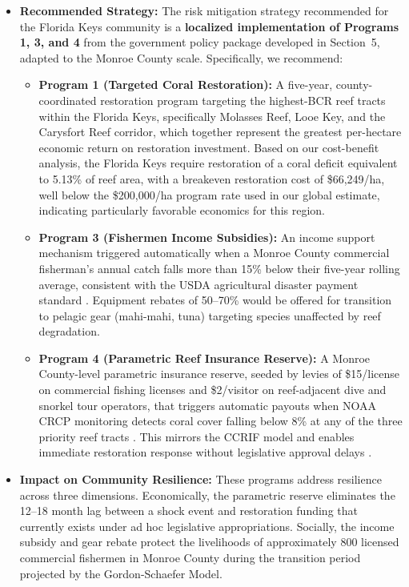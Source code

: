 \documentclass[10pt,letterpaper]{article}
\newcounter{metric}
\begin{document}
\begin{itemize}

    \item \textbf{Recommended Strategy:} The risk mitigation strategy recommended for the Florida Keys community is a \textbf{localized implementation of Programs 1, 3, and 4} from the government policy package developed in Section~5, adapted to the Monroe County scale. Specifically, we recommend:
    \begin{itemize}
        \item \textbf{Program 1 (Targeted Coral Restoration):} A five-year, county-coordinated restoration program targeting the highest-BCR reef tracts within the Florida Keys, specifically Molasses Reef, Looe Key, and the Carysfort Reef corridor, which together represent the greatest per-hectare economic return on restoration investment. Based on our cost-benefit analysis, the Florida Keys require restoration of a coral deficit equivalent to 5.13\% of reef area, with a breakeven restoration cost of \$66,249/ha, well below the \$200,000/ha program rate used in our global estimate, indicating particularly favorable economics for this region.
        \item \textbf{Program 3 (Fishermen Income Subsidies):} An income support mechanism triggered automatically when a Monroe County commercial fisherman's annual catch falls more than 15\% below their five-year rolling average, consistent with the USDA agricultural disaster payment standard \cite{usda_disaster}. Equipment rebates of 50--70\% would be offered for transition to pelagic gear (mahi-mahi, tuna) targeting species unaffected by reef degradation.
        \item \textbf{Program 4 (Parametric Reef Insurance Reserve):} A Monroe County-level parametric insurance reserve, seeded by levies of \$15/license on commercial fishing licenses and \$2/visitor on reef-adjacent dive and snorkel tour operators, that triggers automatic payouts when NOAA CRCP monitoring detects coral cover falling below 8\% at any of the three priority reef tracts \cite{noaa_crcp}. This mirrors the CCRIF model and enables immediate restoration response without legislative approval delays \cite{ccrif_reef_insurance}.
    \end{itemize}

    \item \textbf{Impact on Community Resilience:} These programs address resilience across three dimensions. Economically, the parametric reserve eliminates the 12--18 month lag between a shock event and restoration funding that currently exists under ad hoc legislative appropriations. Socially, the income subsidy and gear rebate protect the livelihoods of approximately 800 licensed commercial fishermen in Monroe County during the transition period projected by the Gordon-Schaefer Model.


\end{itemize}
\end{document}
